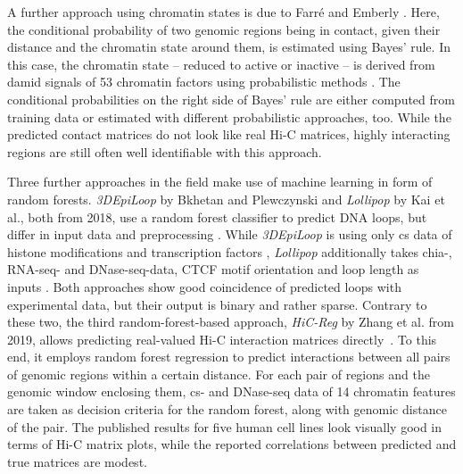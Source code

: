 A further approach using chromatin states is due to Farr\'e and Emberly \cite{Farre2018}.
Here, the conditional probability of two genomic regions being in contact, given their distance and the chromatin state around them,
is estimated using Bayes' rule. 
In this case, the chromatin state -- reduced to active or inactive -- is derived from \acrfull{damid} signals of 53 chromatin factors using probabilistic methods \cite{Zhou2016}.
The conditional probabilities on the right side of Bayes' rule are either computed from training data or estimated with different probabilistic approaches, too.
While the predicted contact matrices do not look like real Hi-C matrices, highly interacting regions are still often well identifiable with this approach.

Three further approaches in the field make use of machine learning in form of random forests. 
\emph{3DEpiLoop} by Bkhetan and Plewczynski and \emph{Lollipop} by Kai et al., 
both from 2018, use a random forest classifier to predict DNA loops, but differ in input data and preprocessing  \cite{Bkhetan2018, Kai2018}.
While \emph{3DEpiLoop} is using only \acrshort{cs} data of histone modifications and transcription factors \cite{Bkhetan2018},
\emph{Lollipop} additionally takes \acrshort{chia}-, RNA-seq- and DNase-seq-data, CTCF motif orientation and loop length as inputs \cite{Kai2018}.
Both approaches show good coincidence of predicted loops with experimental data, but their output is binary and rather sparse.
Contrary to these two, the third random-forest-based approach, \emph{HiC-Reg} by Zhang et al. from 2019, allows predicting real-valued
Hi-C interaction matrices directly~\cite{Zhang2019}. 
To this end, it employs random forest regression to predict interactions
between all pairs of genomic regions within a certain distance. 
For each pair of regions and the genomic window enclosing them, \acrshort{cs}- and DNase-seq data of 14 chromatin features 
are taken as decision criteria for the random forest, along with genomic distance of the pair.
The published results for five human cell lines look visually good in terms of Hi-C matrix plots, while the reported correlations between predicted and true matrices are modest.


